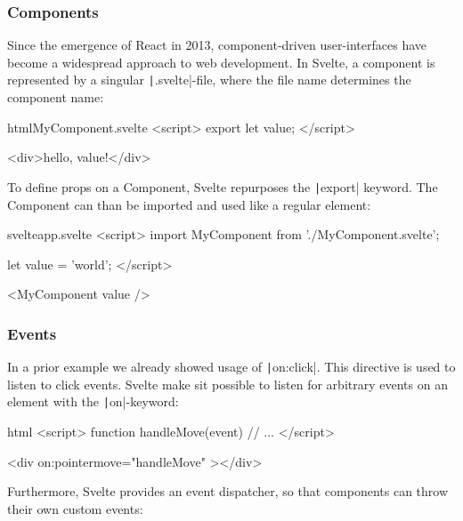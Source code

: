 \subsubsection{Components}


Since the emergence of React in 2013, component-driven user-interfaces have become a widespread approach to web development. In Svelte, a component is represented by a singular \texttt|.svelte|-file, where the file name determines the component name: 

\begin{myminted}{html}{MyComponent.svelte}
<script>
    export let value;
</script>

<div>hello, {value}!</div>
\end{myminted}

To define props on a Component, Svelte repurposes the \texttt|export| keyword. The Component can than be imported and used like a regular element:

\begin{myminted}{svelte}{app.svelte}
<script>
    import MyComponent from './MyComponent.svelte';

    let value = 'world';
</script>

<MyComponent {value} />
\end{myminted}

\subsubsection{Events}


In a prior example we already showed usage of \texttt|on:click|. This directive is used to listen to click events. Svelte make sit possible to listen for arbitrary events on an element with the \texttt|on|-keyword:

\begin{myminted}[highlightlines={7}]{html}{}
<script>
    function handleMove(event) {
        // ...
    }
</script>

<div on:pointermove="{handleMove}" ></div>
\end{myminted}

Furthermore, Svelte provides an event dispatcher, so that components can throw their own custom events:

